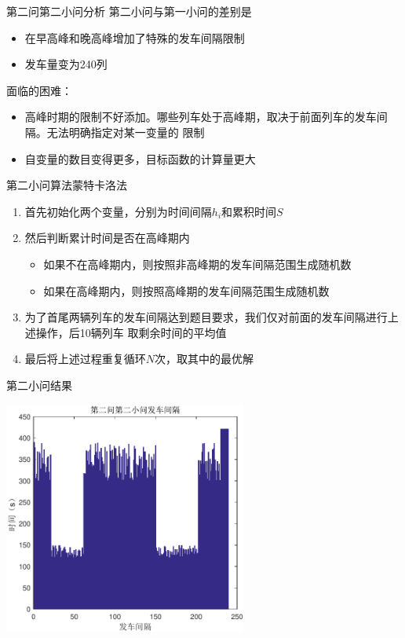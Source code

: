 \documentclass{beamer}
\begin{document}
\begin{frame}{第二问第二小问分析}
第二小问与第一小问的差别是
\begin{itemize}
    \item 在早高峰和晚高峰增加了特殊的发车间隔限制
    \item 发车量变为240列
\end{itemize}
面临的困难：
\begin{itemize}
    \item 高峰时期的限制不好添加。哪些列车处于高峰期，取决于前面列车的发车间隔。无法明确指定对某一变量的
    限制
    \item 自变量的数目变得更多，目标函数的计算量更大
\end{itemize}
\end{frame}

\begin{frame}{第二小问算法}{蒙特卡洛法}
\begin{enumerate}
  \item<1-> 首先初始化两个变量，分别为时间间隔$h_i$和累积时间$S$
  \item<2-> 然后判断累计时间是否在高峰期内
  \begin{itemize}
    \item<3-> 如果不在高峰期内，则按照非高峰期的发车间隔范围生成随机数
    \item<4-> 如果在高峰期内，则按照高峰期的发车间隔范围生成随机数
  \end{itemize}

  \item<5-> 为了首尾两辆列车的发车间隔达到题目要求，我们仅对前面的发车间隔进行上述操作，后10辆列车
  取剩余时间的平均值
  \item<6-> 最后将上述过程重复循环$N$次，取其中的最优解
\end{enumerate}
\end{frame}

\begin{frame}{第二小问结果}
\begin{center}
\includegraphics[width=8cm]{fig/fig14/fig14.pdf}
\end{center}
\end{frame}
\end{document}
